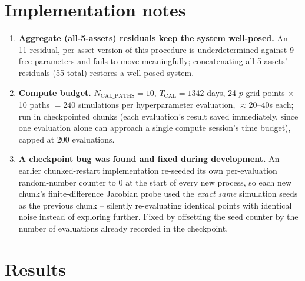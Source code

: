 \documentclass[11pt]{article}
\begin{document}
\section{Implementation notes}
\begin{enumerate}
\item \textbf{Aggregate (all-5-assets) residuals keep the system well-posed.} An
11-residual, per-asset version of this procedure is underdetermined against 9+ free
parameters and fails to move meaningfully; concatenating all 5 assets' residuals (55
total) restores a well-posed system.
\item \textbf{Compute budget.} $N_{\text{CAL\_PATHS}}=10$, $T_{\text{CAL}}=1342$ days,
24 $p$-grid points $\times$ 10 paths $=240$ simulations per hyperparameter evaluation,
$\approx20$--$40$s each; run in checkpointed chunks (each evaluation's result saved
immediately, since one evaluation alone can approach a single compute session's time
budget), capped at 200 evaluations.
\item \textbf{A checkpoint bug was found and fixed during development.} An earlier
chunked-restart implementation re-seeded its own per-evaluation random-number counter
to 0 at the start of every new process, so each new chunk's finite-difference Jacobian
probe used the \emph{exact same} simulation seeds as the previous chunk -- silently
re-evaluating identical points with identical noise instead of exploring further.
Fixed by offsetting the seed counter by the number of evaluations already recorded in
the checkpoint.
\end{enumerate}

\section{Results}
\label{sec:results}
\end{document}
